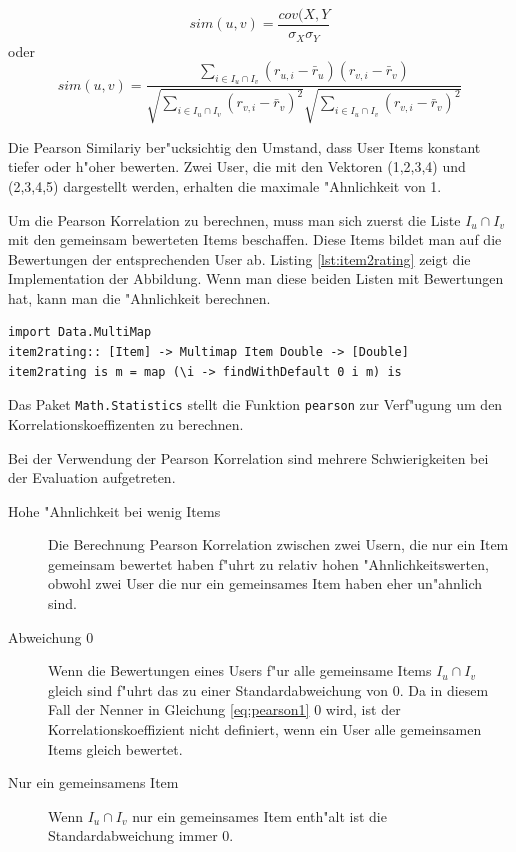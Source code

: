 \documentclass[a4paper, 12pt]{article}
\begin{document}
\begin{equation}
\label{eq:pearson1}
 sim(u,v) = \frac{cov(X,Y}{\sigma_X \sigma_Y} 
\end{equation}
oder
\begin{equation}
  \label{eq:pearson}
  sim(u,v)  = \frac{\sum_{i \in I_u \cap I_v}(r_{u,i} - \bar{r}_u)(r_{v,i} - \bar{r}_v)}{\sqrt{\sum_{i \in I_u \cap I_v}( r_{v,i} - \bar{r}_v)^2}\sqrt{\sum_{i \in I_u \cap I_v}( r_{v,i} - \bar{r}_v)^2}}
\end{equation}

Die Pearson Similariy ber"ucksichtig den Umstand, dass User Items konstant tiefer oder h"oher bewerten. Zwei User, die mit den Vektoren (1,2,3,4) und (2,3,4,5) dargestellt werden, erhalten die maximale "Ahnlichkeit von 1.

Um die Pearson Korrelation zu berechnen, muss man sich zuerst die Liste $I_u \cap I_v$ mit den gemeinsam bewerteten Items beschaffen. Diese Items bildet man auf die Bewertungen der entsprechenden User ab. Listing \ref{lst:item2rating} zeigt die Implementation der Abbildung. Wenn man diese beiden Listen mit Bewertungen hat, kann man die "Ahnlichkeit berechnen.

\begin{lstlisting}[caption=Implementation: Abbildung Items zu Bewertungen, label=lst:item2rating]
import Data.MultiMap
item2rating:: [Item] -> Multimap Item Double -> [Double]
item2rating is m = map (\i -> findWithDefault 0 i m) is
\end{lstlisting}

Das Paket \verb|Math.Statistics| stellt die Funktion \verb|pearson| zur Verf"ugung um den Korrelationskoeffizenten zu berechnen.

Bei der Verwendung der Pearson Korrelation sind mehrere Schwierigkeiten bei der Evaluation aufgetreten.

\begin{description}
\item[Hohe "Ahnlichkeit bei wenig Items] Die Berechnung Pearson Korrelation zwischen zwei Usern, die nur ein Item gemeinsam bewertet haben f"uhrt zu relativ hohen "Ahnlichkeitswerten, obwohl zwei User die nur ein gemeinsames Item haben eher un"ahnlich sind.
\item[Abweichung 0] Wenn die Bewertungen eines Users f"ur alle gemeinsame Items  $I_u \cap I_v$ gleich sind f"uhrt das zu einer Standardabweichung von 0. Da in diesem Fall der Nenner in Gleichung \ref{eq:pearson1} 0 wird, ist der Korrelationskoeffizient nicht definiert, wenn ein User alle gemeinsamen Items gleich bewertet.
\item[Nur ein gemeinsamens Item] Wenn  $I_u \cap I_v$ nur ein gemeinsames Item enth"alt ist die Standardabweichung immer 0.
\end{description}
\end{document}
